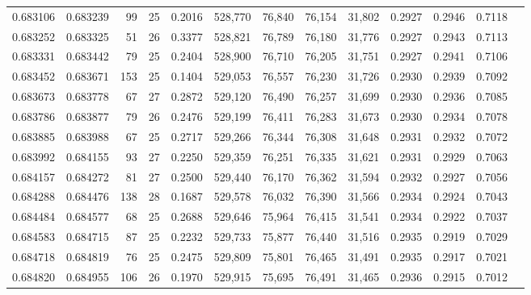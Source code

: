 \begin{tabular}{rrrrrrrrrrrrr}
0.683106 & 0.683239 &    99 &  25 &                                     0.2016 & 528,770 &  76,840 &  76,154 &  31,802 & 0.2927 & 0.2946 & 0.7118 \\
0.683252 & 0.683325 &    51 &  26 &                                     0.3377 & 528,821 &  76,789 &  76,180 &  31,776 & 0.2927 & 0.2943 & 0.7113 \\
0.683331 & 0.683442 &    79 &  25 &                                     0.2404 & 528,900 &  76,710 &  76,205 &  31,751 & 0.2927 & 0.2941 & 0.7106 \\
0.683452 & 0.683671 &   153 &  25 &                                     0.1404 & 529,053 &  76,557 &  76,230 &  31,726 & 0.2930 & 0.2939 & 0.7092 \\
0.683673 & 0.683778 &    67 &  27 &                                     0.2872 & 529,120 &  76,490 &  76,257 &  31,699 & 0.2930 & 0.2936 & 0.7085 \\
0.683786 & 0.683877 &    79 &  26 &                                     0.2476 & 529,199 &  76,411 &  76,283 &  31,673 & 0.2930 & 0.2934 & 0.7078 \\
0.683885 & 0.683988 &    67 &  25 &                                     0.2717 & 529,266 &  76,344 &  76,308 &  31,648 & 0.2931 & 0.2932 & 0.7072 \\
0.683992 & 0.684155 &    93 &  27 &                                     0.2250 & 529,359 &  76,251 &  76,335 &  31,621 & 0.2931 & 0.2929 & 0.7063 \\
0.684157 & 0.684272 &    81 &  27 &                                     0.2500 & 529,440 &  76,170 &  76,362 &  31,594 & 0.2932 & 0.2927 & 0.7056 \\
0.684288 & 0.684476 &   138 &  28 &                                     0.1687 & 529,578 &  76,032 &  76,390 &  31,566 & 0.2934 & 0.2924 & 0.7043 \\
0.684484 & 0.684577 &    68 &  25 &                                     0.2688 & 529,646 &  75,964 &  76,415 &  31,541 & 0.2934 & 0.2922 & 0.7037 \\
0.684583 & 0.684715 &    87 &  25 &                                     0.2232 & 529,733 &  75,877 &  76,440 &  31,516 & 0.2935 & 0.2919 & 0.7029 \\
0.684718 & 0.684819 &    76 &  25 &                                     0.2475 & 529,809 &  75,801 &  76,465 &  31,491 & 0.2935 & 0.2917 & 0.7021 \\
0.684820 & 0.684955 &   106 &  26 &                                     0.1970 & 529,915 &  75,695 &  76,491 &  31,465 & 0.2936 & 0.2915 & 0.7012 \\

\end{tabular}
